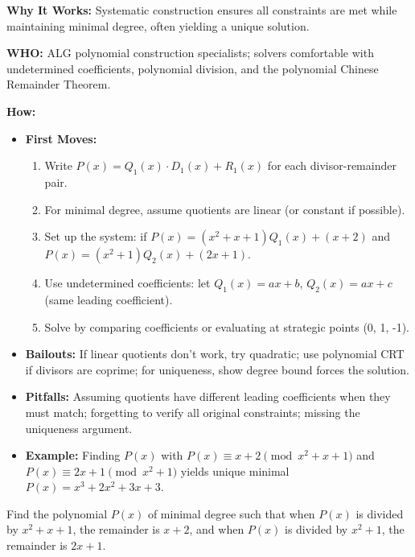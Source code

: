 \documentclass[12pt]{article}
\newenvironment{problem}[1]
{\begin{tcolorbox}[colback=blue!5!white,colframe=blue!75!black,title={#1}]}{\end{tcolorbox}}
\begin{document}
\textbf{Why It Works:} Systematic construction ensures all constraints are met while maintaining minimal degree, often yielding a unique solution.

\textbf{WHO:} ALG polynomial construction specialists; solvers comfortable with undetermined coefficients, polynomial division, and the polynomial Chinese Remainder Theorem.

\textbf{How:}
\begin{itemize}
    \item \textbf{First Moves:}
    \begin{enumerate}[nosep]
        \item Write $P(x) = Q_1(x) \cdot D_1(x) + R_1(x)$ for each divisor-remainder pair.
        \item For minimal degree, assume quotients are linear (or constant if possible).
        \item Set up the system: if $P(x) = (x^2+x+1)Q_1(x) + (x+2)$ and $P(x) = (x^2+1)Q_2(x) + (2x+1)$.
        \item Use undetermined coefficients: let $Q_1(x) = ax+b$, $Q_2(x) = ax+c$ (same leading coefficient).
        \item Solve by comparing coefficients or evaluating at strategic points (0, 1, -1).
    \end{enumerate}
    \item \textbf{Bailouts:} If linear quotients don't work, try quadratic; use polynomial CRT if divisors are coprime; for uniqueness, show degree bound forces the solution.
    \item \textbf{Pitfalls:} Assuming quotients have different leading coefficients when they must match; forgetting to verify all original constraints; missing the uniqueness argument.
    \item \textbf{Example:} Finding $P(x)$ with $P(x) \equiv x+2 \pmod{x^2+x+1}$ and $P(x) \equiv 2x+1 \pmod{x^2+1}$ yields unique minimal $P(x) = x^3+2x^2+3x+3$.
\end{itemize}

\begin{problem}{Example: Minimal Polynomial with Two Remainder Conditions}
Find the polynomial $P(x)$ of minimal degree such that when $P(x)$ is divided by $x^2+x+1$, the remainder is $x+2$, and when $P(x)$ is divided by $x^2+1$, the remainder is $2x+1$.
\end{problem}
\end{document}
